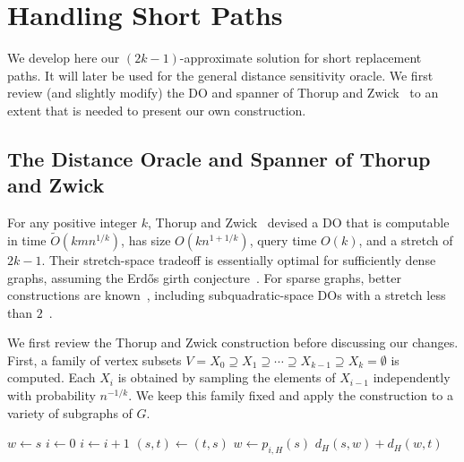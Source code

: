 \documentclass{theoretics}
\newcommand*{\Otilde}{\widetilde{O}}
\begin{document}
\section{Handling Short Paths}
\label{sec:short_paths}

We develop here our $(2k{-}1)$-approximate solution for short replacement paths.
It will later be used for the general distance sensitivity oracle.
We first review (and slightly modify) 
the DO and spanner of Thorup and Zwick~\cite{ThorupZ05}
to an extent that is needed to present our own construction.

\subsection{The Distance Oracle and Spanner of Thorup and Zwick}
\label{subsec:short_paths_TZ}

For any positive integer $k$, 
Thorup and Zwick~\cite{ThorupZ05} devised a DO
that is computable in time $\Otilde(kmn^{1/k})$, has size $O(kn^{1+1/k})$, query time $O(k)$,
and a stretch of $2k-1$.
Their stretch-space tradeoff is essentially optimal for sufficiently dense graphs,
assuming the Erdős girth conjecture~\cite{ThorupZ05}.
For sparse graphs, better constructions are known~\cite{Abraham11AffineStretch,PatrascuRoditty14BeyondThorupZwick,Patrascu11NewInfinity},
including subquadratic-space DOs with a stretch less than $2$~\cite{Agarwal14SpaceStretchTimeTradeoffDOs,AgarwalBrightenGodfrey13DOsStretchLessThan2}.

We first review the Thorup and Zwick construction before discussing our changes.
First, a family of vertex subsets 
$V = X_0 \supseteq X_1\supseteq \cdots \supseteq X_{k-1}  \supseteq X_k = \emptyset$ is computed.
Each $X_i$ is obtained by sampling the elements of $X_{i-1}$ independently with probability $n^{-1/k}$.
We keep this family fixed and
apply the construction to a variety of subgraphs of $G$.

\setcounter{AlgoLine}{0}
\begin{algorithm}[H]
    $w\gets s$\; 
    $i\gets 0$\; 
    {
        $i\gets i+1$\;
        $(s,t)\gets (t,s)$\;  
        $w\gets p_{i,H}(s)$\;
    }
    \Return $d_H(s,w)+d_H(w,t)$\;
\caption{Original query algorithm \cite{ThorupZ05} of the distance oracle for the pair $(s,t)$.}
\label{alg:query_TZ}
\end{algorithm}
 
\end{document}
